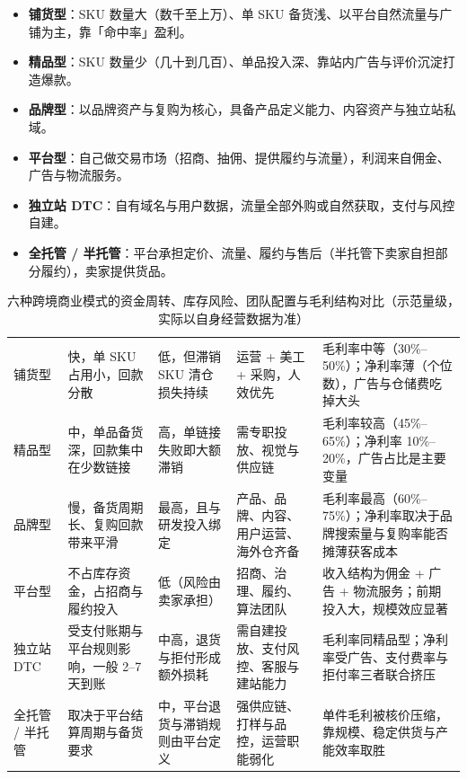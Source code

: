 \begin{itemize}
  \item \textbf{铺货型}：SKU 数量大（数千至上万）、单 SKU 备货浅、以平台自然流量与广铺为主，靠「命中率」盈利。
  \item \textbf{精品型}：SKU 数量少（几十到几百）、单品投入深、靠站内广告与评价沉淀打造爆款。
  \item \textbf{品牌型}：以品牌资产与复购为核心，具备产品定义能力、内容资产与独立站私域。
  \item \textbf{平台型}：自己做交易市场（招商、抽佣、提供履约与流量），利润来自佣金、广告与物流服务。
  \item \textbf{独立站 DTC}：自有域名与用户数据，流量全部外购或自然获取，支付与风控自建。
  \item \textbf{全托管 / 半托管}：平台承担定价、流量、履约与售后（半托管下卖家自担部分履约），卖家提供货品。
\end{itemize}

\begin{table}[htbp]
\centering
\caption{六种跨境商业模式的资金周转、库存风险、团队配置与毛利结构对比（示范量级，实际以自身经营数据为准）}
\label{tab:cbec-models}
\small
\begin{tabularx}{\textwidth}{L{1.9cm} L{2.2cm} L{2.0cm} L{2.3cm} Y}
\toprule
{} &  &  &  &  \\
\midrule
铺货型 & 快，单 SKU 占用小，回款分散 & 低，但滞销 SKU 清仓损失持续 & 运营 + 美工 + 采购，人效优先 & 毛利率中等（30\%--50\%）；净利率薄（个位数），广告与仓储费吃掉大头 \\
\addlinespace
精品型 & 中，单品备货深，回款集中在少数链接 & 高，单链接失败即大额滞销 & 需专职投放、视觉与供应链 & 毛利率较高（45\%--65\%）；净利率 10\%--20\%，广告占比是主要变量 \\
\addlinespace
品牌型 & 慢，备货周期长、复购回款带来平滑 & 最高，且与研发投入绑定 & 产品、品牌、内容、用户运营、海外仓齐备 & 毛利率最高（60\%--75\%）；净利率取决于品牌搜索量与复购率能否摊薄获客成本 \\
\addlinespace
平台型 & 不占库存资金，占招商与履约投入 & 低（风险由卖家承担） & 招商、治理、履约、算法团队 & 收入结构为佣金 + 广告 + 物流服务；前期投入大，规模效应显著 \\
\addlinespace
独立站 DTC & 受支付账期与平台规则影响，一般 2--7 天到账 & 中高，退货与拒付形成额外损耗 & 需自建投放、支付风控、客服与建站能力 & 毛利率同精品型；净利率受广告、支付费率与拒付率三者联合挤压 \\
\addlinespace
全托管 / 半托管 & 取决于平台结算周期与备货要求 & 中，平台退货与滞销规则由平台定义 & 强供应链、打样与品控，运营职能弱化 & 单件毛利被核价压缩，靠规模、稳定供货与产能效率取胜 \\
\bottomrule
\end{tabularx}
\end{table}

